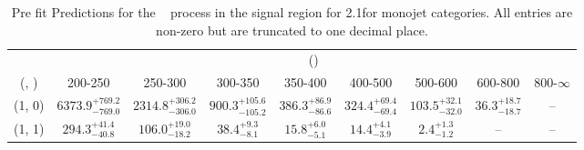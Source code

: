 \begin{table}[h!]
\tiny
\centering
\caption{Pre fit Predictions for the \zInv~ process in the signal region for 2.1\ifb for monojet categories. All entries are non-zero but are truncated to one decimal place.\label{tab:predsepnaive_sig_zinv_mono}}
\begin{tabular}
{ccccccccc}
	\hline\hline
	& \multicolumn{8}{c}{\scalht (\gev)} \\ 
	 (\njet,  \nb) & 200-250 & 250-300 & 300-350 & 350-400 & 400-500 & 500-600 & 600-800 & 800-$\infty$ \\ [0.8ex] 
\hline
	(1, 0) & $6373.9^{+ 769.2 }_{- 769.0 }$ & $2314.8^{+ 306.2 }_{- 306.0 }$ & $900.3^{+ 105.6 }_{- 105.2 }$ & $386.3^{+ 86.9 }_{- 86.6 }$ & $324.4^{+ 69.4 }_{- 69.4 }$ & $103.5^{+ 32.1 }_{- 32.0 }$ & $36.3^{+ 18.7 }_{- 18.7 }$ & -- \\[0.5ex] 
	(1, 1) & $294.3^{+ 41.4 }_{- 40.8 }$ & $106.0^{+ 19.0 }_{- 18.2 }$ & $38.4^{+ 9.3 }_{- 8.1 }$ & $15.8^{+ 6.0 }_{- 5.1 }$ & $14.4^{+ 4.1 }_{- 3.9 }$ & $2.4^{+ 1.3 }_{- 1.2 }$ & -- & -- \\[0.5ex] 
	\hline
	\hline
\end{tabular}
\end{table}
